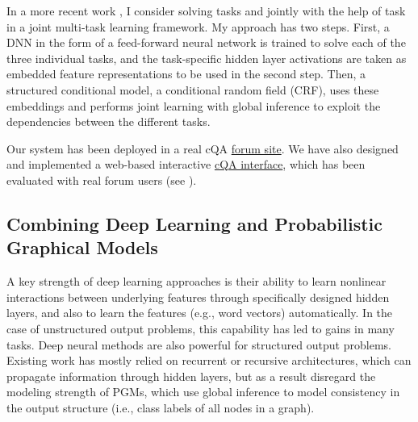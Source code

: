 \documentclass{article} %
\begin{document}
In a more recent work \cite{Shafiq16_cqa_tacl}, I consider solving tasks \Nb and \Nc jointly with the help of task \Na in a joint multi-task learning framework. My approach has two steps. First, a DNN in the form of a feed-forward neural network is trained to solve each of the three individual tasks, and the task-specific hidden layer activations are taken as embedded feature representations to be used in the second step. Then, a structured conditional  model, a conditional random field (CRF), uses these embeddings and performs joint learning with global inference to exploit the dependencies between the different tasks. 










Our system has been deployed in a real cQA \href{http://www.qatarliving.com/betasearch} {forum site}. We have also designed and implemented a web-based interactive \href{http://www.qatarliving.com/betasearch}{cQA interface}, which has been evaluated with real forum users (see \cite{Hoque:Joty:17}).



\subsection{Combining Deep Learning and Probabilistic Graphical Models}
A key strength of deep learning approaches is their ability to learn nonlinear interactions between underlying features through specifically designed hidden layers, and also to learn the features (e.g., word vectors) automatically. In the case of unstructured output problems, this capability has led to gains in many tasks. Deep neural methods are also powerful for structured output problems. Existing work has mostly relied on recurrent or recursive architectures, which can propagate information through hidden layers, but as a result disregard the modeling strength of PGMs, which use global inference to model consistency in the output structure (i.e., class labels of all nodes in a graph). 
\end{document}
